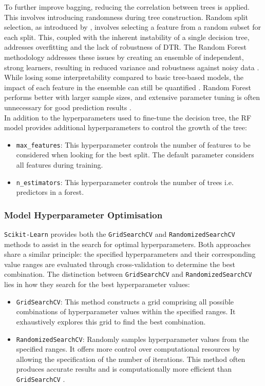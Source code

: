 \documentclass[]{interact}
\theoremstyle{plain}%
\theoremstyle{definition}
\theoremstyle{remark}
\begin{document}
To further improve bagging, reducing the correlation between trees is applied. This involves introducing randomness during tree construction. Random split selection, as introduced by \citet{Dietterich.2000}, involves selecting a feature from a random subset for each split. This, coupled with the inherent instability of a single decision tree, addresses overfitting and the lack of robustness of DTR. The Random Forest methodology addresses these issues by creating an ensemble of independent, strong learners, resulting in reduced variance and robustness against noisy data \citep{Breiman.2001}. While losing some interpretability compared to basic tree-based models, the impact of each feature in the ensemble can still be quantified \citep{Kuhn.2013}. Random Forest performs better with larger sample sizes, and extensive parameter tuning is often unnecessary for good prediction results \citep{Kuhn.2013, Hastie.2009}.\\

In addition to the hyperparameters used to fine-tune the decision tree, the RF model provides additional hyperparameters to control the growth of the tree:

\begin{itemize}
  \item \texttt{max\_features}: This hyperparameter controls the number of features to be considered when looking for the best split. The default parameter considers all features during training.
  \item \texttt{n\_estimators}: This hyperparameter controls the number of trees i.e. predictors in a forest.
\end{itemize}

\subsubsection{Model Hyperparameter Optimisation}\label{sec:hpo_opti_J}

\texttt{Scikit-Learn} provides both the {\tt GridSearchCV} and {\tt RandomizedSearchCV} methods to assist in the search for optimal hyperparameters. Both approaches share a similar principle: the specified hyperparameters and their corresponding value ranges are evaluated through cross-validation to determine the best combination. The distinction between {\tt GridSearchCV} and {\tt RandomizedSearchCV} lies in how they search for the best hyperparameter values:

\begin{itemize}
  \item {\tt GridSearchCV}: This method constructs a grid comprising all possible combinations of hyperparameter values within the specified ranges. It exhaustively explores this grid to find the best combination.
  \item {\tt RandomizedSearchCV}: Randomly samples hyperparameter values from the specified ranges. It offers more control over computational resources by allowing the specification of the number of iterations. This method often produces accurate results and is computationally more efficient than {\tt GridSearchCV} \citep{J.Bergstra.2012}.
\end{itemize}
\end{document}
